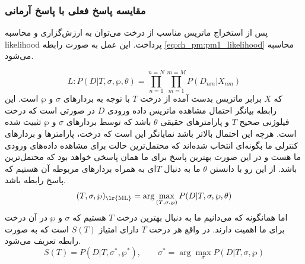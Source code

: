 \subsubsection{مقایسه پاسخ فعلی با پاسخ آرمانی}
پس از استخراج ماتریس مناسب از درخت می‌توان به ارزش‌گزاری و محاسبه \gls{likelihood} پرداخت. این عمل به صورت رابطه \ref{eq:ch_pm:pm1_likelihood} محاسبه می‌شود. 

\begin{equation}
	L: P(D|T,\sigma, \wp, \theta) = \prod_{n=1}^{n=N}\prod_{m=1}^{m=M}P(D_{nm}|X_{nm})
	\label{eq:ch_pm:pm1_likelihood}
\end{equation}
که $X$ برابر ماتریس بدست آمده از درخت $T$ با توجه به بردارهای $\sigma$ و $\wp$ است. این رابطه بیانگر احتمال مشاهده ماتریس داده ورودی $D$ در صورتی است که درخت فیلوژنی صحیح $T$ و پارامترهای حقیقی $\theta$ باشد که توسط بردارهای $\sigma$ و $\wp$ تثبیت شده است. هرچه این احتمال بالاتر باشد نمایانگر این است که درخت، پارامترها و بردارهای کنترلی ما بگونه‌ای انتخاب شده‌اند که محتمل‌ترین حالت برای مشاهده داده‌های ورودی ما هست و در این صورت بهترین پاسخ برای ما همان پاسخی خواهد بود که محتمل‌ترین باشد. از این رو با دانستن $\theta$ ما به دنبال $T$ای به همراه بردارهای مربوطه آن هستیم که پاسخ رابطه \label{eq:ch_pm:pm1_maxML} باشد.
\begin{equation}
	(T, \sigma, \wp)_{\text{\lr{ML}}} = \arg\max_{(T, \sigma, \wp)} P(D|T,\sigma, \wp, \theta)
	\label{eq:ch_pm:pm1_maxML}
\end{equation}
 اما همانگونه که می‌دانیم ما به دنبال بهترین درخت $T$ هستیم که $\sigma$ و $\wp$ در آن درخت برای ما اهمیت دارند. در واقع هر درخت $T$ دارای امتیاز $S(T)$ است که به صورت رابطه \label{eq:ch_pm:pm1_sT} تعریف می‌شود.
 \begin{equation}
 	S(T) = P(D|T,\sigma^*, \wp^*), \qquad \sigma^*=\arg\max_{\sigma}P(D|T,\sigma, \wp)
 	\label{eq:ch_pm:pm1_sT}
 \end{equation}

